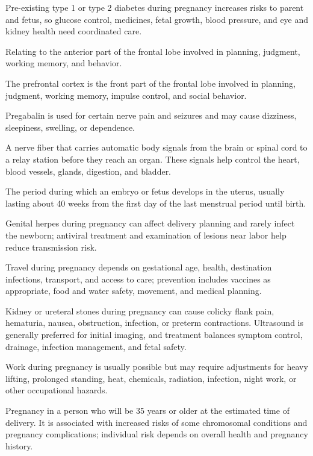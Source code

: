  Pre-existing type 1 or type 2 diabetes during pregnancy increases risks to parent and fetus, so glucose control, medicines, fetal growth, blood pressure, and eye and kidney health need coordinated care.

 Relating to the anterior part of the frontal lobe involved in planning, judgment, working memory, and behavior.

 The prefrontal cortex is the front part of the frontal lobe involved in planning, judgment, working memory, impulse control, and social behavior.

 Pregabalin is used for certain nerve pain and seizures and may cause dizziness, sleepiness, swelling, or dependence.

 A nerve fiber that carries automatic body signals from the brain or spinal cord to a relay station before they reach an organ. These signals help control the heart, blood vessels, glands, digestion, and bladder.

 The period during which an embryo or fetus develops in the uterus, usually lasting about 40 weeks from the first day of the last menstrual period until birth.

 Genital herpes during pregnancy can affect delivery planning and rarely infect the newborn; antiviral treatment and examination of lesions near labor help reduce transmission risk.

 Travel during pregnancy depends on gestational age, health, destination infections, transport, and access to care; prevention includes vaccines as appropriate, food and water safety, movement, and medical planning.

 Kidney or ureteral stones during pregnancy can cause colicky flank pain, hematuria, nausea, obstruction, infection, or preterm contractions. Ultrasound is generally preferred for initial imaging, and treatment balances symptom control, drainage, infection management, and fetal safety.

 Work during pregnancy is usually possible but may require adjustments for heavy lifting, prolonged standing, heat, chemicals, radiation, infection, night work, or other occupational hazards.

 Pregnancy in a person who will be 35 years or older at the estimated time of delivery. It is associated with increased risks of some chromosomal conditions and pregnancy complications; individual risk depends on overall health and pregnancy history.

